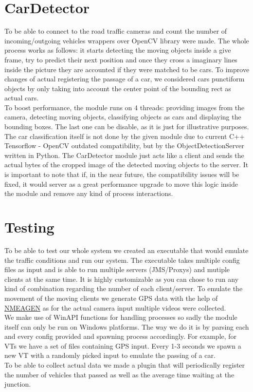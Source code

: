 \documentclass[17pt]{report}
\begin{document}
\pagebreak
\section{CarDetector}
\indent \indent
To be able to connect to the road traffic cameras and count the number of 
incoming/outgoing vehicles wrappers over OpenCV library were made. The whole process 
works as follows: it starts detecting the moving objects inside a give frame, try to 
predict their next position and once they cross a imaginary lines inside the picture
they are accounted if they were matched to be cars. To improve changes 
of actual registering the passage of a car, we considered cars 
punctiform objects by only taking into account the center point of the 
bounding rect as actual cars. \\
\indent
To boost performance, the module runs on 4 threads: providing images
from the camera, detecting moving objects, classifying objects as
cars and displaying the bounding boxes. The last one can be disable,
as it is just for illustrative purposes. \\
\indent 
The car classification itself is 
not done by the given module due to current C++ Tensorflow - OpenCV outdated compatibility,
but by the ObjectDetectionServer written in Python. The CarDetector module just acts 
like a client and sends the actual bytes of the cropped image of the detected moving objects 
to the server. It is important to note that if, in the near future, the compatibility issues
will be fixed, it would server as a great performance upgrade to move this logic
inside the module and remove any kind of process interactions.

\section{Testing}
\indent \indent
To be able to test our whole system we created an executable that 
would emulate the traffic conditions and run our system. The executable 
takes multiple config files as input and is able to run multiple 
servers (JMS/Proxys) and mutiple clients at the same time. It is 
highly customizable as you can chose to run any kind of combination 
regarding the number of each client/server. To emulate the movement of 
the moving clients we generate GPS data with the help of 
\href{https://www.nmeagen.org/}{NMEAGEN} as for the actual camera input 
multiple videos were collected.  \\
\indent
We make use of WinAPI functions for handling processes so sadly the 
module itself can only be run on Windows platforms. The way we do it 
is by parsing each and every config provided and spawning process 
accordingly. For example, for VTs we have a set of files containing 
GPS input. Every 1-3 seconds we spawn a new VT with a randomly
picked input to emulate the passing of a car.\\
\indent
To be able to collect actual data we made a plugin that will 
periodically register the number of vehicles that passed as well as 
the average time waiting at the junction.
\end{document}
